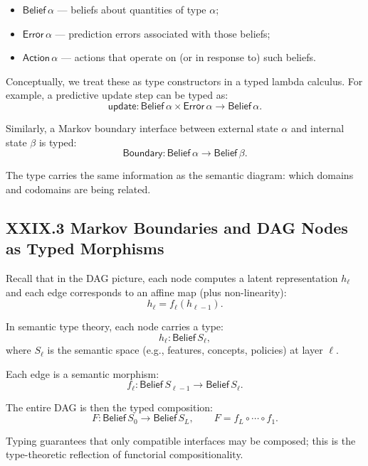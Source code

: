 \documentclass[11pt,letterpaper]{article}
\begin{document}
\begin{itemize}
  \item $\mathsf{Belief}\,\alpha$ --- beliefs about quantities of type $\alpha$;
  \item $\mathsf{Error}\,\alpha$ --- prediction errors associated with those beliefs;
  \item $\mathsf{Action}\,\alpha$ --- actions that operate on (or in response to) such beliefs.
\end{itemize}

Conceptually, we treat these as type constructors in a typed lambda calculus. For example, a predictive update step can be typed as:
\[
\mathsf{update} : \mathsf{Belief}\,\alpha \times \mathsf{Error}\,\alpha \to \mathsf{Belief}\,\alpha.
\]

Similarly, a Markov boundary interface between external state $\alpha$ and internal state $\beta$ is typed:
\[
\mathsf{Boundary} : \mathsf{Belief}\,\alpha \to \mathsf{Belief}\,\beta.
\]

The type carries the same information as the semantic diagram: which domains and codomains are being related.

\subsection{XXIX.3 Markov Boundaries and DAG Nodes as Typed Morphisms}

Recall that in the DAG picture, each node computes a latent representation $h_\ell$ and each edge corresponds to an affine map (plus non-linearity):
\[
h_{\ell} = f_\ell(h_{\ell-1}).
\]

In semantic type theory, each node carries a type:
\[
h_\ell : \mathsf{Belief}\,S_\ell,
\]
where $S_\ell$ is the semantic space (e.g., features, concepts, policies) at layer $\ell$.

Each edge is a semantic morphism:
\[
f_\ell : \mathsf{Belief}\,S_{\ell-1} \to \mathsf{Belief}\,S_{\ell}.
\]

The entire DAG is then the typed composition:
\[
F : \mathsf{Belief}\,S_0 \to \mathsf{Belief}\,S_L, \qquad
F = f_L \circ \cdots \circ f_1.
\]

Typing guarantees that only compatible interfaces may be composed; this is the type-theoretic reflection of functorial compositionality.

\end{document}
